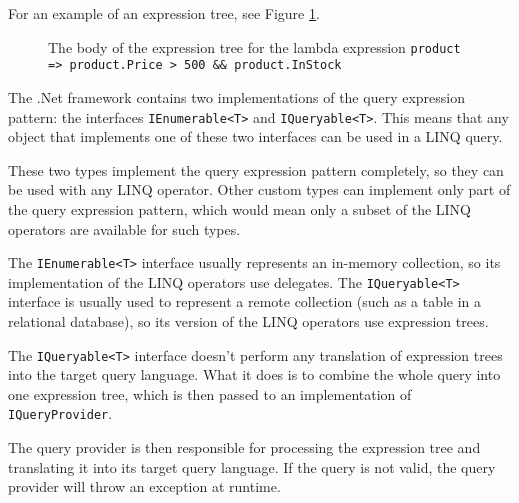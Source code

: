For an example of an expression tree, see Figure \ref{Expression tree}.

\begin{figure}[htbp]
\begin{center}
\end{center}

\caption{The body of the expression tree for the lambda expression \lstinline,product => product.Price > 500 && product.InStock,}
\label{Expression tree}
\end{figure}

The .Net framework contains two implementations of the query expression pattern:
the interfaces \lstinline,IEnumerable<T>, and \lstinline,IQueryable<T>,.
This means that any object that implements one of these two interfaces can be used in a LINQ query.

These two types implement the query expression pattern completely,
so they can be used with any LINQ operator.
Other custom types can implement only part of the query expression pattern,
which would mean only a subset of the LINQ operators are available for such types.

The \lstinline,IEnumerable<T>, interface usually represents an in-memory collection,
so its implementation of the LINQ operators use delegates.
The \lstinline,IQueryable<T>, interface is usually used to represent a remote collection
(such as a table in a relational database),
so its version of the LINQ operators use expression trees.

The \lstinline,IQueryable<T>, interface doesn't perform any translation of expression trees
into the target query language.
What it does is to combine the whole query into one expression tree,
which is then passed to an implementation of \lstinline,IQueryProvider,.

The query provider is then responsible for processing the expression tree
and translating it into its target query language.
If the query is not valid, the query provider will throw an exception at runtime.